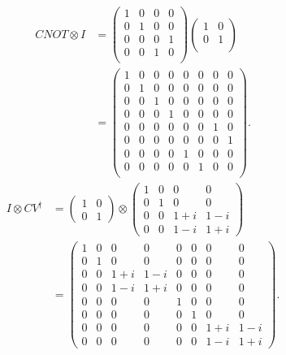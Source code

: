 \documentclass[10pt]{article}
\begin{document}
\begin{align*}
CNOT \otimes I 
&= 
\begin{pmatrix}
1 & 0 & 0 & 0 \\
0 & 1 & 0 & 0 \\
0 & 0 & 0 & 1 \\
0 & 0 & 1 & 0 \\
\end{pmatrix}
\begin{pmatrix}
1 & 0 \\
0 & 1 \\
\end{pmatrix} \\
&= 
\begin{pmatrix}
1 & 0 & 0 & 0 & 0 & 0 & 0 & 0 \\
0 & 1 & 0 & 0 & 0 & 0 & 0 & 0 \\
0 & 0 & 1 & 0 & 0 & 0 & 0 & 0 \\
0 & 0 & 0 & 1 & 0 & 0 & 0 & 0 \\
\hline 
0 & 0 & 0 & 0 & 0 & 0 & 1 & 0 \\
0 & 0 & 0 & 0 & 0 & 0 & 0 & 1\\
0 & 0 & 0 & 0 & 1 & 0 & 0 & 0 \\
0 & 0 & 0 & 0 & 0 & 1 & 0 & 0 \\ 
\end{pmatrix}.
\end{align*}
\begin{align*}
I \otimes CV^{\dag} &= 
\begin{pmatrix}
1 & 0 \\
0 & 1
\end{pmatrix}
\otimes 
\begin{pmatrix}
1 & 0 & 0 & 0 \\
0 & 1 & 0 & 0 \\
0 & 0 & 1 +i & 1 - i \\
0 & 0 & 1 - i & 1 + i 
\end{pmatrix} \\
&= 
\begin{pmatrix}
1 & 0 & 0 & 0 & 0 & 0 & 0 & 0 \\
0 & 1 & 0 & 0 & 0 & 0 & 0 & 0 \\
0 & 0 & 1 + i & 1 - i & 0 & 0 & 0 & 0 \\
0 & 0 & 1 - i & 1 + i & 0 & 0 & 0 & 0 \\
\hline
0 & 0 & 0 & 0 & 1 & 0 & 0 & 0 \\
0 & 0 & 0 & 0 & 0 & 1 & 0 & 0 \\
0 & 0 & 0 & 0 & 0 & 0 & 1+i & 1-i \\
0 & 0 & 0 & 0 & 0 & 0 & 1-i & 1+i
\end{pmatrix}.
\end{align*}
\end{document}
